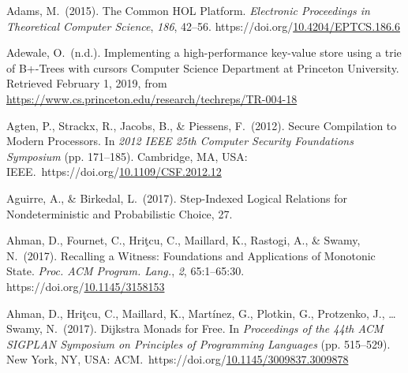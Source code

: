\documentclass[12pt,twoside]{article}
\begin{document}
{\begin{thebibliography}{1079}
\mdbibitemlabel{}Adams, M.~(2015). The Common HOL Platform. \emph{Electronic Proceedings in Theoretical Computer Science}, \emph{186}, 42–56. https://doi.org/\href{https://dx.doi.org/10.4204/EPTCS.186.6}{10.4204/EPTCS.186.6}%

\mdbibitemlabel{}Adewale, O.~(n.d.). Implementing a high-performance key-value store using a trie of B+-Trees with cursors \textbar{} Computer Science Department at Princeton University. Retrieved February 1, 2019, from \href{https://www.cs.princeton.edu/research/techreps/TR-004-18}{{\ttfamily https://\hspace{0pt}www.\hspace{0pt}cs.\hspace{0pt}princeton.\hspace{0pt}edu/\hspace{0pt}research/\hspace{0pt}techreps/\hspace{0pt}TR-\hspace{0pt}004-\hspace{0pt}18}}%

\mdbibitemlabel{}Agten, P., Strackx, R., Jacobs, B., \& Piessens, F.~(2012). Secure Compilation to Modern Processors. In \emph{2012 IEEE 25th Computer Security Foundations Symposium} (pp. 171–185). Cambridge, MA, USA: IEEE.~https://doi.org/\href{https://dx.doi.org/10.1109/CSF.2012.12}{10.1109/CSF.2012.12}%

\mdbibitemlabel{}Aguirre, A., \& Birkedal, L.~(2017). Step-Indexed Logical Relations for Nondeterministic and Probabilistic Choice, 27.%

\mdbibitemlabel{}Ahman, D., Fournet, C., Hriţcu, C., Maillard, K., Rastogi, A., \& Swamy, N.~(2017). Recalling a Witness: Foundations and Applications of Monotonic State. \emph{Proc. ACM Program. Lang.}, \emph{2}, 65:1–65:30. https://doi.org/\href{https://dx.doi.org/10.1145/3158153}{10.1145/3158153}%

\mdbibitemlabel{}Ahman, D., Hriţcu, C., Maillard, K., Martínez, G., Plotkin, G., Protzenko, J., … Swamy, N.~(2017). Dijkstra Monads for Free. In \emph{Proceedings of the 44th ACM SIGPLAN Symposium on Principles of Programming Languages} (pp. 515–529). New York, NY, USA: ACM.~https://doi.org/\href{https://dx.doi.org/10.1145/3009837.3009878}{10.1145/3009837.3009878}%


\end{thebibliography}}
\end{document}
